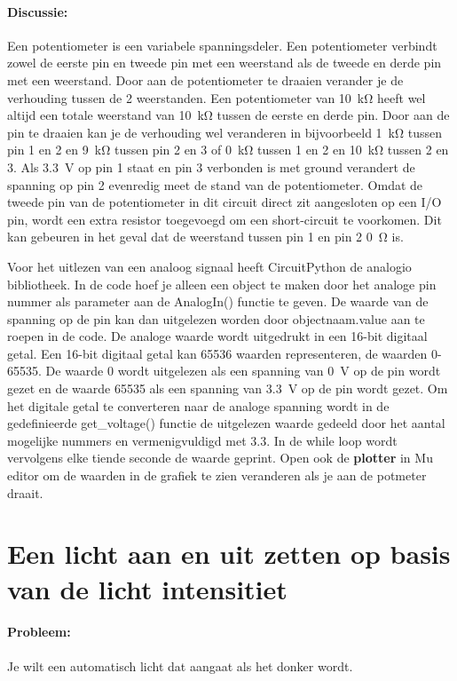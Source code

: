 \paragraph{Discussie:} Een potentiometer is een variabele spanningsdeler. Een potentiometer verbindt zowel de eerste pin en tweede pin met een weerstand als de tweede en derde pin met een weerstand. Door aan de potentiometer te draaien verander je de verhouding tussen de 2 weerstanden. Een potentiometer van \SI{10}{\kilo\ohm} heeft wel altijd een totale weerstand van \SI{10}{\kilo\ohm} tussen de eerste en derde pin. Door aan de pin te draaien kan je de verhouding wel veranderen in bijvoorbeeld \SI{1}{\kilo\ohm} tussen pin 1 en 2 en \SI{9}{\kilo\ohm} tussen pin 2 en 3 of \SI{0}{\kilo\ohm} tussen 1 en 2 en \SI{10}{\kilo\ohm} tussen 2 en 3.  Als \SI{3.3}{\volt} op pin 1 staat en pin 3 verbonden is met ground verandert de spanning op pin 2 evenredig meet de stand van de potentiometer. Omdat de tweede pin van de potentiometer in dit circuit direct zit aangesloten op een I/O pin, wordt een extra resistor toegevoegd om een short-circuit te voorkomen. Dit kan gebeuren in het geval dat de weerstand tussen pin 1 en pin 2 \SI{0}{\ohm} is.

Voor het uitlezen van een analoog signaal heeft CircuitPython de analogio bibliotheek. In de code hoef je alleen een object te maken door het analoge pin nummer als parameter aan de AnalogIn() functie te geven. De waarde van de spanning op de pin kan dan uitgelezen worden door objectnaam.value aan te roepen in de code.  De analoge waarde wordt uitgedrukt in een 16-bit digitaal getal. Een 16-bit digitaal getal kan 65536 waarden representeren, de waarden 0-65535. De waarde 0 wordt uitgelezen als een spanning van \SI{0}{\volt} op de pin wordt gezet en de waarde 65535 als een spanning van \SI{3.3}{\volt} op de pin wordt gezet. Om het digitale getal te converteren naar de analoge spanning wordt in de gedefinieerde get\_voltage() functie de uitgelezen waarde gedeeld door het aantal mogelijke nummers en vermenigvuldigd met 3.3. In de while loop wordt vervolgens elke tiende seconde de waarde geprint. Open ook de \textbf{plotter} in Mu editor om de waarden in de grafiek te zien veranderen als je aan de potmeter draait.

\newpage
\section{Een licht aan en uit zetten op basis van de licht intensitiet}
	\paragraph{Probleem:} Je wilt een automatisch licht dat aangaat als het donker wordt.
